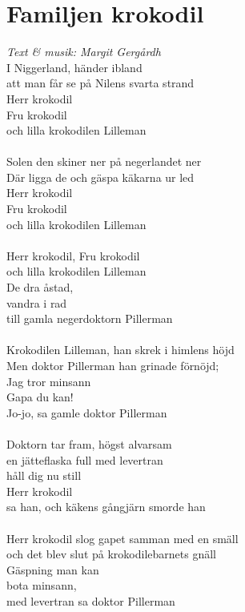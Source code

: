 \section{Familjen krokodil}
\textit{Text \& musik: Margit Gergårdh}
\vspace{2mm}\\
I Niggerland, händer ibland\\
att man får se på Nilens svarta strand\\
Herr krokodil\\
Fru krokodil\\
och lilla krokodilen Lilleman\\
\\
Solen den skiner ner på negerlandet ner\\
Där ligga de och gäspa käkarna ur led\\
Herr krokodil\\
Fru krokodil\\
och lilla krokodilen Lilleman\\
\\
Herr krokodil, Fru krokodil\\
och lilla krokodilen Lilleman\\
De dra åstad,\\
vandra i rad\\
till gamla negerdoktorn Pillerman\\
\\
Krokodilen Lilleman, han skrek i himlens höjd\\
Men doktor Pillerman han grinade förnöjd;\\
Jag tror minsann\\
Gapa du kan!\\
Jo-jo, sa gamle doktor Pillerman\\
\\
Doktorn tar fram, högst alvarsam\\
en jätteflaska full med levertran\\
håll dig nu still\\
Herr krokodil\\
sa han, och käkens gångjärn smorde han\\
\\
Herr krokodil slog gapet samman med en smäll\\
och det blev slut på krokodilebarnets gnäll\\
Gäspning man kan\\
bota minsann,\\
med levertran sa doktor Pillerman\\

